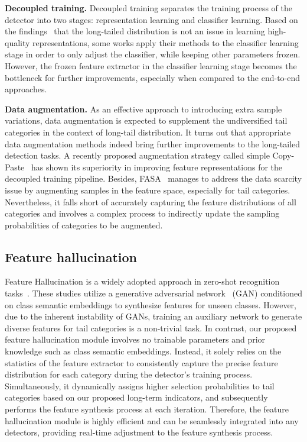 \documentclass[lettersize,journal]{IEEEtran}
\begin{document}
\noindent\textbf{Decoupled training.} Decoupled training separates the training process of the detector into two stages: representation learning and classifier learning.
Based on the findings~\cite{kang2019decoupling} that the long-tailed distribution is not an issue in learning high-quality representations, some works\cite{wang2020devil,li2020overcoming,zhang2021distribution,wang2021adaptive,feng2021exploring} apply their methods to the classifier learning stage in order to only adjust the classifier, while keeping other parameters frozen.
However, the frozen feature extractor in the classifier learning stage becomes the bottleneck for further improvements, especially when compared to the end-to-end approaches.

\noindent\textbf{Data augmentation.} As an effective approach to introducing extra sample variations, data augmentation is expected to supplement the undiversified tail categories in the context of long-tail distribution.
It turns out that appropriate data augmentation methods indeed bring further improvements to the long-tailed detection tasks.
A recently proposed augmentation strategy called simple Copy-Paste~\cite{ghiasi2021simple} has shown its superiority in improving feature representations for the decoupled training pipeline.
Besides, FASA~\cite{zang2021fasa} manages to address the data scarcity issue by augmenting samples in the feature space, especially for tail categories.
Nevertheless, it falls short of accurately capturing the feature distributions of all categories and involves a complex process to indirectly update the sampling probabilities of categories to be augmented.

\subsection{Feature hallucination}
Feature Hallucination is a widely adopted approach in zero-shot recognition tasks~\cite{zhu2020don,hayat2020synthesizing,zhao2020gtnet}.
These studies utilize a generative adversarial network~\cite{goodfellow2020generative} (GAN) conditioned on class semantic embeddings to synthesize features for unseen classes.
However, due to the inherent instability of GANs, training an auxiliary network to generate diverse features for tail categories is a non-trivial task.
In contrast, our proposed feature hallucination module involves no trainable parameters and prior knowledge such as class semantic embeddings.
Instead, it solely relies on the statistics of the feature extractor to consistently capture the precise feature distribution for each category during the detector's training process.
Simultaneously, it dynamically assigns higher selection probabilities to tail categories based on our proposed long-term indicators, and subsequently performs the feature synthesis process at each iteration.
Therefore, the feature hallucination module is highly efficient and can be seamlessly integrated into any detectors, providing real-time adjustment to the feature synthesis process.
\end{document}
